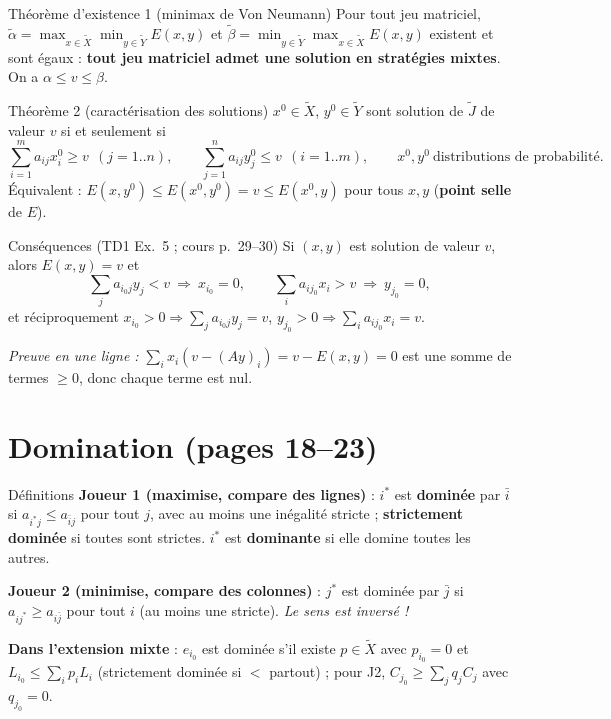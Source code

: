 \documentclass[11pt,a4paper]{article}
\newcommand{\Xt}{\tilde{X}}
\newcommand{\Yt}{\tilde{Y}}
\begin{document}
\begin{propbox}{Théorème d'existence 1 (minimax de Von Neumann)}
Pour tout jeu matriciel, $\tilde\alpha=\max_{x\in\Xt}\min_{y\in\Yt}E(x,y)$ et $\tilde\beta=\min_{y\in\Yt}\max_{x\in\Xt}E(x,y)$ existent et sont égaux : \textbf{tout jeu matriciel admet une solution en stratégies mixtes}. On a $\alpha\le v\le\beta$.
\end{propbox}

\begin{propbox}{Théorème 2 (caractérisation des solutions)}
$x^0\in\Xt$, $y^0\in\Yt$ sont solution de $\tilde J$ de valeur $v$ si et seulement si
\[
\sum_{i=1}^m a_{ij}x^0_i\ge v\ \ (j=1..n),\qquad \sum_{j=1}^n a_{ij}y^0_j\le v\ \ (i=1..m),\qquad x^0,y^0\ \text{distributions de probabilité}.
\]
Équivalent : $E(x,y^0)\le E(x^0,y^0)=v\le E(x^0,y)$ pour tous $x,y$ (\textbf{point selle} de $E$).
\end{propbox}

\begin{propbox}{Conséquences (TD1 Ex.~5 ; cours p.~29--30)}
Si $(x,y)$ est solution de valeur $v$, alors $E(x,y)=v$ et
\[
\sum_j a_{i_0j}y_j<v\ \Rightarrow\ x_{i_0}=0,\qquad \sum_i a_{ij_0}x_i>v\ \Rightarrow\ y_{j_0}=0,
\]
et réciproquement $x_{i_0}>0\Rightarrow\sum_j a_{i_0j}y_j=v$, $y_{j_0}>0\Rightarrow\sum_i a_{ij_0}x_i=v$.

\emph{Preuve en une ligne :} $\sum_i x_i(v-(Ay)_i)=v-E(x,y)=0$ est une somme de termes $\ge0$, donc chaque terme est nul.
\end{propbox}

\section{Domination (pages 18--23)}

\begin{propbox}{Définitions}
\textbf{Joueur 1 (maximise, compare des lignes)} : $i^*$ est \textbf{dominée} par $\bar i$ si $a_{i^*j}\le a_{\bar ij}$ pour tout $j$, avec au moins une inégalité stricte ; \textbf{strictement dominée} si toutes sont strictes. $i^*$ est \textbf{dominante} si elle domine toutes les autres.

\textbf{Joueur 2 (minimise, compare des colonnes)} : $j^*$ est dominée par $\bar j$ si $a_{ij^*}\ge a_{i\bar j}$ pour tout $i$ (au moins une stricte). \emph{Le sens est inversé !}

\textbf{Dans l'extension mixte} : $e_{i_0}$ est dominée s'il existe $p\in\Xt$ avec $p_{i_0}=0$ et $L_{i_0}\le\sum_i p_iL_i$ (strictement dominée si $<$ partout) ; pour J2, $C_{j_0}\ge\sum_j q_jC_j$ avec $q_{j_0}=0$.
\end{propbox}
\end{document}
